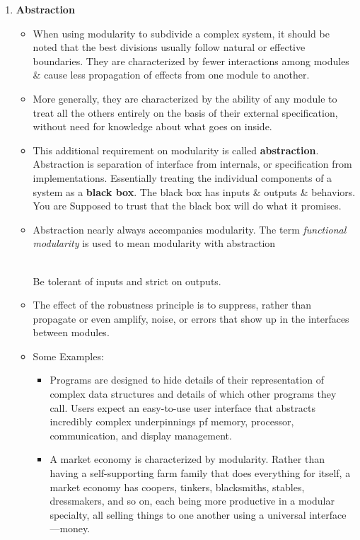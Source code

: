 \documentclass{article}
\begin{document}
\begin{enumerate}
    \item \textbf{Abstraction}
    \begin{itemize}
        \item When using modularity to subdivide a complex system, it should be noted that the best divisions usually follow natural or effective boundaries. They are characterized by fewer interactions among modules \& cause less propagation of effects from one module to another.
        \item More generally, they are characterized by the ability of any module to treat all the others entirely on the basis of their external specification, without need for knowledge about what goes on inside.
        \item This additional requirement on modularity is called \textbf{abstraction}. Abstraction is separation of interface from internals, or specification from implementations. Essentially treating the individual components of a system as a \textbf{black box}. The black box has inputs \& outputs \& behaviors. You are Supposed to trust that the black box will do what it promises. 
        \item Abstraction nearly always accompanies modularity. The term \textit{functional modularity} is used to mean modularity with abstraction
        \begin{tcolorbox} [title= Design Principle:, colback=black!10!white]
        \\
            Be tolerant of inputs and strict on outputs.
        \end{tcolorbox}
        \item The effect of the robustness principle is to suppress, rather than propagate or even amplify, noise, or errors that show up in the interfaces between modules.
        \item[] Some Examples:
        \begin{itemize}
            \item Programs are designed to hide details of their representation of complex data structures and details of which other programs they call. Users expect an easy-to-use user interface that abstracts incredibly complex underpinnings pf memory, processor, communication, and display management.
            \item A market economy is characterized by modularity. Rather than having a self-supporting farm family that
            does everything for itself, a market economy has coopers, tinkers, blacksmiths, stables, dressmakers, and so on, each being more productive in a modular specialty, all selling things to one another using a universal interface—money.
        \end{itemize}
    \end{itemize}


\end{enumerate}
\end{document}

